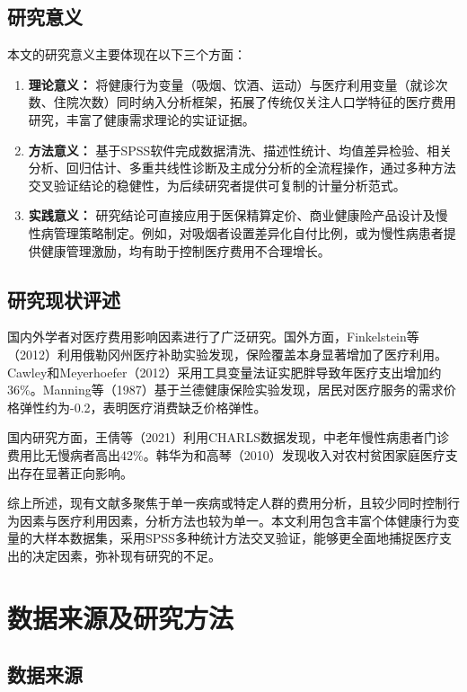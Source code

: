 \documentclass[a4paper]{ctexart}
\begin{document}
\subsection{研究意义}

本文的研究意义主要体现在以下三个方面：

\begin{enumerate}[label=(\arabic*)]
\item \textbf{理论意义：} 将健康行为变量（吸烟、饮酒、运动）与医疗利用变量（就诊次数、住院次数）同时纳入分析框架，拓展了传统仅关注人口学特征的医疗费用研究，丰富了健康需求理论的实证证据。

\item \textbf{方法意义：} 基于SPSS软件完成数据清洗、描述性统计、均值差异检验、相关分析、回归估计、多重共线性诊断及主成分分析的全流程操作，通过多种方法交叉验证结论的稳健性，为后续研究者提供可复制的计量分析范式。

\item \textbf{实践意义：} 研究结论可直接应用于医保精算定价、商业健康险产品设计及慢性病管理策略制定。例如，对吸烟者设置差异化自付比例，或为慢性病患者提供健康管理激励，均有助于控制医疗费用不合理增长。
\end{enumerate}

\subsection{研究现状评述}

国内外学者对医疗费用影响因素进行了广泛研究。国外方面，Finkelstein等（2012）利用俄勒冈州医疗补助实验发现，保险覆盖本身显著增加了医疗利用。Cawley和Meyerhoefer（2012）采用工具变量法证实肥胖导致年医疗支出增加约36\%。Manning等（1987）基于兰德健康保险实验发现，居民对医疗服务的需求价格弹性约为-0.2，表明医疗消费缺乏价格弹性。

国内研究方面，王倩等（2021）利用CHARLS数据发现，中老年慢性病患者门诊费用比无慢病者高出42\%。韩华为和高琴（2010）发现收入对农村贫困家庭医疗支出存在显著正向影响。

综上所述，现有文献多聚焦于单一疾病或特定人群的费用分析，且较少同时控制行为因素与医疗利用因素，分析方法也较为单一。本文利用包含丰富个体健康行为变量的大样本数据集，采用SPSS多种统计方法交叉验证，能够更全面地捕捉医疗支出的决定因素，弥补现有研究的不足。

\section{数据来源及研究方法}

\subsection{数据来源}
\end{document}
